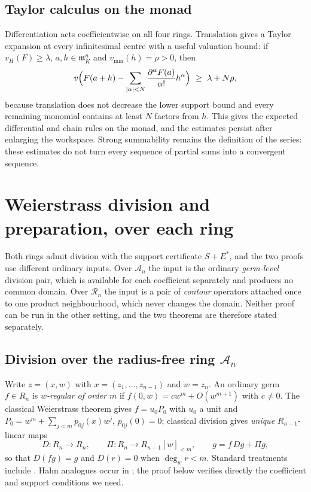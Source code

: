 \documentclass[11pt,letterpaper]{article}
\theoremstyle{definition}
\theoremstyle{remark}
\newcommand{\A}{\mathscr A}
\newcommand{\RR}{\mathscr R}
\newcommand{\m}{\mathfrak m}
\newcommand{\vH}{v_{\!H}}
\newcommand{\vmin}{v_{\min}}
\numberwithin{equation}{section}
\begin{document}
\subsection{Taylor calculus on the monad}\label{analytic:subsec:taylor}
Differentiation acts coefficientwise on all four rings. Translation gives a
Taylor expansion at every infinitesimal centre with a useful valuation
bound: if $\vH(F)\ge\lambda$, $a,h\in\m_K^n$ and $\vmin(h)=\rho>0$, then
\begin{equation}\label{analytic:eq:taylor-bound}
 v\Bigl(F(a+h)-\sum_{|\alpha|<N}
 \frac{\partial^\alpha F(a)}{\alpha!}h^\alpha\Bigr)\ \ge\ \lambda+N\rho,
\end{equation}
because translation does not decrease the lower support bound and every
remaining monomial contains at least $N$ factors from $h$. This gives the
expected differential and chain rules on the monad, and the estimates
persist after enlarging the workspace. Strong summability remains the
definition of the series: these estimates do not turn every sequence of
partial sums into a convergent sequence.

\section{Weierstrass division and preparation, over each ring}
\label{analytic:sec:division}

Both rings admit division with the support certificate $S+E^*$, and the two
proofs use different ordinary inputs. Over $\A_n$ the input is the ordinary
\emph{germ-level} division pair, which is available for each coefficient
separately and produces no common domain. Over $\RR_n$ the input is a pair
of \emph{contour} operators attached once to one product neighbourhood,
which never changes the domain. Neither proof can be run in the other
setting, and the two theorems are therefore stated separately.

\subsection{Division over the radius-free ring $\A_n$}
\label{analytic:subsec:divA}
Write $z=(x,w)$ with $x=(z_1,\ldots,z_{n-1})$ and $w=z_n$. An ordinary germ
$f\in R_n$ is \emph{$w$-regular of order $m$} if
$f(0,w)=cw^m+O(w^{m+1})$ with $c\ne0$. The classical Weierstrass theorem
gives $f=u_0P_0$ with $u_0$ a unit and
$P_0=w^m+\sum_{j<m}p_{0j}(x)w^j$, $p_{0j}(0)=0$; classical division gives
\emph{unique} $R_{n-1}$-linear maps
\[
 D:R_n\to R_n,\qquad \Pi:R_n\to R_{n-1}[w]_{<m},\qquad
 g=f\,Dg+\Pi g,
\]
so that $D(fg)=g$ and $D(r)=0$ when $\deg_wr<m$. Standard treatments include
\cite{GrauertRemmert}. Hahn analogues occur in \cite{CL,CLR}; the proof
below verifies directly the coefficient and support conditions we need.
\end{document}
